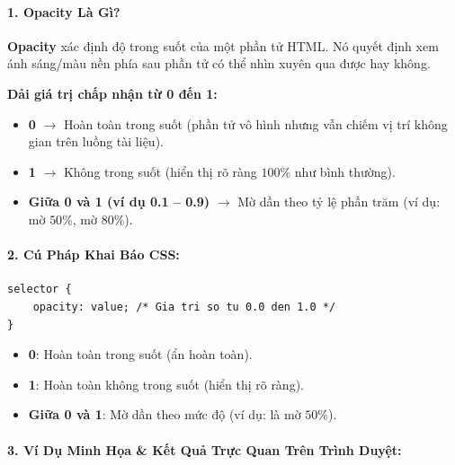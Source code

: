 \paragraph{1. Opacity Là Gì?}

\begin{conceptBox}
\textbf{Opacity} xác định độ trong suốt của một phần tử HTML. Nó quyết định xem ánh sáng/màu nền phía sau phần tử có thể nhìn xuyên qua được hay không.
\par\vspace{4pt}
\textbf{Dải giá trị chấp nhận từ 0 đến 1:}
\begin{itemize}[leftmargin=1.5em, itemsep=3pt, parsep=0pt]
    \item \textbf{0} $\rightarrow$ Hoàn toàn trong suốt (phần tử vô hình nhưng vẫn chiếm vị trí không gian trên luồng tài liệu).
    \item \textbf{1} $\rightarrow$ Không trong suốt (hiển thị rõ ràng $100\%$ như bình thường).
    \item \textbf{Giữa 0 và 1 (ví dụ 0.1 -- 0.9)} $\rightarrow$ Mờ dần theo tỷ lệ phần trăm (ví dụ:  mờ $50\%$,  mờ $80\%$).
\end{itemize}
\end{conceptBox}

\paragraph{2. Cú Pháp Khai Báo CSS:}

\begin{codeWindow}
\begin{lstlisting}[language=CSS3]
selector {
    opacity: value; /* Gia tri so tu 0.0 den 1.0 */
}
\end{lstlisting}
\end{codeWindow}

\begin{itemize}[leftmargin=1.5em, itemsep=2pt, parsep=0pt]
    \item \textbf{0}: Hoàn toàn trong suốt (ẩn hoàn toàn).
    \item \textbf{1}: Hoàn toàn không trong suốt (hiển thị rõ ràng).
    \item \textbf{Giữa 0 và 1}: Mờ dần theo mức độ (ví dụ:  là mờ $50\%$).
\end{itemize}

\paragraph{3. Ví Dụ Minh Họa \& Kết Quả Trực Quan Trên Trình Duyệt:}

